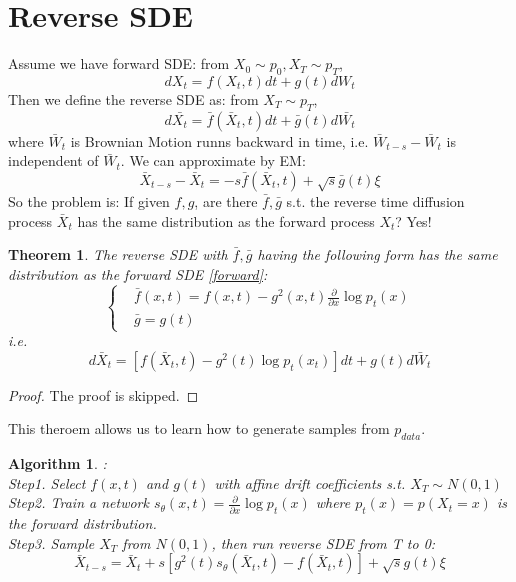 \documentclass{ctexart}
\newtheorem{theorem}{Theorem}
\newtheorem{proof}{Proof}
\newtheorem{algorithm}{Algorithm}
\begin{document}
\section{Reverse SDE}
Assume we have forward SDE: from $X_0\sim p_0,X_T\sim p_T$,
\begin{equation}\label{forward}
    dX_t = f(X_t, t)dt + g(t)dW_t
\end{equation}
Then we define the reverse SDE as: from $X_T\sim p_T$,
\begin{equation}
    d\bar{X_t}=\bar{f}(\bar{X}_t, t)dt + \bar{g}(t)d\bar{W_t}
\end{equation}
where $\bar{W}_t$ is Brownian Motion runns backward in time, i.e. $\bar{W}_{t-s}-\bar{W}_t$ is independent of $\bar{W}_t$. We can approximate by EM:
\begin{equation}
    \bar{X}_{t-s}-\bar{X}_t=-s\bar{f}(\bar{X}_t, t) + \sqrt{s}\bar{g}(t)\xi
\end{equation}
So the problem is: If given $f,g$, are there $\bar{f},\bar{g}$ s.t. the reverse time diffusion process $\bar{X}_t$ has the same distribution as the forward process $X_t$? Yes!
\begin{theorem}
    The reverse SDE with $\bar{f},\bar{g}$ having the following form has the same distribution as the forward SDE \ref{forward}:
    \begin{equation}\left\{
        \begin{aligned}
            &\bar{f}(x,t)=f(x,t)-g^2(x,t)\frac{\partial}{\partial x}\log p_t(x)\\
            &\bar{g}=g(t)
        \end{aligned}\right.
    \end{equation}
    i.e. 
    \begin{equation}
        d\bar{X}_t = \left[f(\bar{X}_t, t)-g^2(t)\log p_t(x_t)\right]dt+g(t)d\bar{W}_t
    \end{equation}
\end{theorem}
\begin{proof}
    The proof is skipped.
\end{proof}
This theroem allows us to learn how to generate samples from $p_{data}$.
\begin{algorithm}:\\
Step1. Select $f(x, t)$ and $g(t)$ with affine drift coefficients s.t. $X_T\sim N(0, 1)$\\
Step2. Train a network $s_\theta(x, t)=\frac{\partial}{\partial x}\log p_t(x)$ where $p_t(x)=p(X_t=x)$ is the forward distribution.\\
Step3. Sample $X_T$ from $N(0, 1)$, then run reverse SDE from T to 0:
\begin{equation}
    \bar{X}_{t-s} = \bar{X}_t + s\left[g^2(t)s_\theta(\bar{X}_t, t)-f(\bar{X}_t, t)\right] + \sqrt{s}g(t)\xi
\end{equation}
\end{algorithm}
\end{document}
